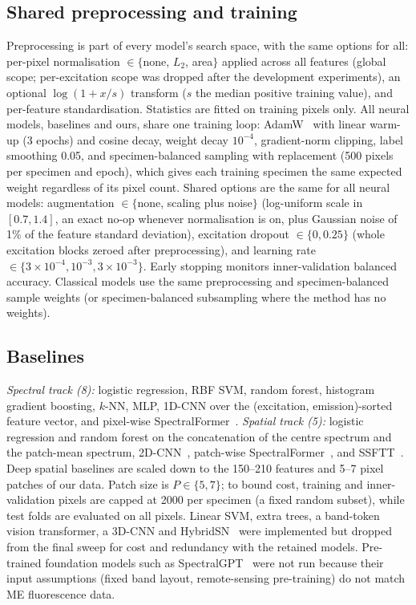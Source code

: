 \documentclass[journal]{IEEEtran}
\begin{document}
\subsection{Shared preprocessing and training}\label{sec:preproc}
Preprocessing is part of every model's search space, with the same options for all: per-pixel normalisation $\in\{$none, $L_2$, area$\}$ applied across all features (global scope; per-excitation scope was dropped after the development experiments), an optional $\log(1+x/s)$ transform ($s$ the median positive training value), and per-feature standardisation. Statistics are fitted on training pixels only. All neural models, baselines and ours, share one training loop: AdamW~\cite{loshchilov2019adamw} with linear warm-up (3 epochs) and cosine decay, weight decay $10^{-4}$, gradient-norm clipping, label smoothing 0.05, and specimen-balanced sampling with replacement (500 pixels per specimen and epoch), which gives each training specimen the same expected weight regardless of its pixel count. Shared options are the same for all neural models: augmentation $\in\{$none, scaling plus noise$\}$ (log-uniform scale in $[0.7,1.4]$, an exact no-op whenever normalisation is on, plus Gaussian noise of 1\% of the feature standard deviation), excitation dropout $\in\{0,0.25\}$ (whole excitation blocks zeroed after preprocessing), and learning rate $\in\{3\!\times\!10^{-4},10^{-3},3\!\times\!10^{-3}\}$. Early stopping monitors inner-validation balanced accuracy. Classical models use the same preprocessing and specimen-balanced sample weights (or specimen-balanced subsampling where the method has no weights).

\subsection{Baselines}
\emph{Spectral track (8):} logistic regression, RBF SVM, random forest, histogram gradient boosting, $k$-NN, MLP, 1D-CNN over the (excitation, emission)-sorted feature vector, and pixel-wise SpectralFormer~\cite{hong2022spectralformer}. \emph{Spatial track (5):} logistic regression and random forest on the concatenation of the centre spectrum and the patch-mean spectrum, 2D-CNN~\cite{chen2016cnnhsi,hamida20183d}, patch-wise SpectralFormer~\cite{hong2022spectralformer}, and SSFTT~\cite{sun2022ssftt}. Deep spatial baselines are scaled down to the 150--210 features and 5--7 pixel patches of our data. Patch size is $P\in\{5,7\}$; to bound cost, training and inner-validation pixels are capped at 2000 per specimen (a fixed random subset), while test folds are evaluated on all pixels. Linear SVM, extra trees, a band-token vision transformer, a 3D-CNN and HybridSN~\cite{roy2020hybridsn} were implemented but dropped from the final sweep for cost and redundancy with the retained models. Pre-trained foundation models such as SpectralGPT~\cite{hong2024spectralgpt} were not run because their input assumptions (fixed band layout, remote-sensing pre-training) do not match ME fluorescence data.
\end{document}
